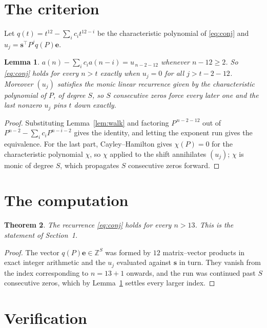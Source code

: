 \documentclass[11pt,a4paper]{article}
\theoremstyle{plain}
\newtheorem{theorem}{Theorem}
\newtheorem{lemma}[theorem]{Lemma}
\theoremstyle{definition}
\begin{document}
\section{The criterion}

Let $q(t)=t^{12}-\sum_i c_i t^{12-i}$ be the characteristic polynomial of
\eqref{eq:conj} and $u_j=\mathbf{s}^{\!\top}P^{j}q(P)\mathbf{e}$.

\begin{lemma}\label{lem:crit}
$a(n)-\sum_i c_i a(n-i)=u_{\,n-2-12}$ whenever $n-12\ge2$. So \eqref{eq:conj}
holds for every $n>t$ exactly when $u_j=0$ for all $j>t-2-12$. Moreover $(u_j)$
satisfies the monic linear recurrence given by the characteristic polynomial of $P$, of
degree $S$, so $S$ consecutive zeros force every later one and the last nonzero $u_j$ pins
$t$ down exactly.
\end{lemma}

\begin{proof}
Substituting Lemma~\ref{lem:walk} and factoring $P^{\,n-2-12}$ out of
$P^{n-2}-\sum_i c_i P^{n-i-2}$ gives the identity, and letting the exponent run gives the
equivalence. For the last part, Cayley--Hamilton gives $\chi(P)=0$ for the characteristic
polynomial $\chi$, so $\chi$ applied to the shift annihilates $(u_j)$; $\chi$ is monic of
degree $S$, which propagates $S$ consecutive zeros forward.
\end{proof}

\section{The computation}

\begin{theorem}
The recurrence \eqref{eq:conj} holds for every $n>13$. This is the statement of
Section~1.
\end{theorem}

\begin{proof}
The vector $q(P)\mathbf{e}\in\mathbb{Z}^{S}$ was formed by $12$ matrix--vector
products in exact integer arithmetic and the $u_j$ evaluated against $\mathbf{s}$ in turn.
They vanish from the index corresponding to $n=13+1$ onwards, and the run was continued
past $S$ consecutive zeros, which by Lemma~\ref{lem:crit} settles every larger index.
\end{proof}

\section{Verification}
\end{document}

